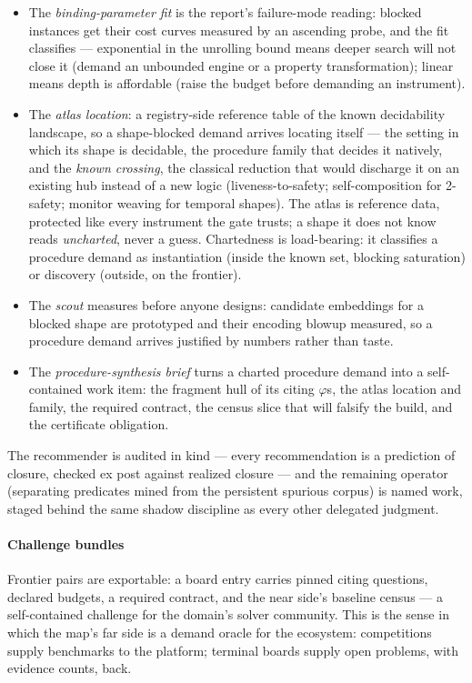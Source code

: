 \begin{itemize}
\item The \emph{binding-parameter fit} is the report's failure-mode
  reading: blocked instances get their cost curves measured by an
  ascending probe, and the fit classifies --- exponential in the
  unrolling bound means deeper search will not close it (demand an
  unbounded engine or a property transformation); linear means depth
  is affordable (raise the budget before demanding an instrument).
\item The \emph{atlas location}: a registry-side reference table of
  the known decidability landscape, so a shape-blocked demand
  arrives locating itself --- the setting in which its shape is
  decidable, the procedure family that decides it natively, and the
  \emph{known crossing}, the classical reduction that would
  discharge it on an existing hub instead of a new logic
  (liveness-to-safety; self-composition for 2-safety; monitor
  weaving for temporal shapes). The atlas is reference data,
  protected like every instrument the gate trusts; a shape it does
  not know reads \textit{uncharted}, never a guess. Chartedness is
  load-bearing: it classifies a procedure demand as instantiation
  (inside the known set, blocking saturation) or discovery (outside,
  on the frontier).
\item The \emph{scout} measures before anyone designs: candidate
  embeddings for a blocked shape are prototyped and their encoding
  blowup measured, so a procedure demand arrives justified by
  numbers rather than taste.
\item The \emph{procedure-synthesis brief} turns a charted
  procedure demand into a self-contained work item: the
  fragment hull of its citing $\varphi$s, the atlas location and
  family, the required contract, the census slice that will falsify
  the build, and the certificate obligation.
\end{itemize}

\noindent
The recommender is audited in kind --- every recommendation is a
prediction of closure, checked ex post against realized closure ---
and the remaining operator (separating predicates mined from the
persistent spurious corpus) is named work, staged behind the same
shadow discipline as every other delegated judgment.

\paragraph{Challenge bundles}
Frontier pairs are exportable: a board entry carries pinned citing
questions, declared budgets, a required contract, and the near side's
baseline census — a self-contained challenge for the domain's solver
community. This is the sense in which the map's far side is a demand
oracle for the ecosystem: competitions supply benchmarks to the
platform; terminal boards supply open problems, with evidence counts,
back.

